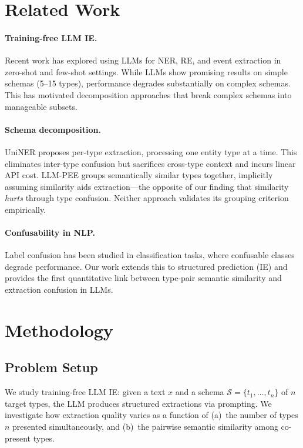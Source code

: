 \documentclass[11pt,a4paper]{article}
\begin{document}
\section{Related Work}
\label{sec:related}

\paragraph{Training-free LLM IE.}
Recent work has explored using LLMs for NER, RE, and event extraction in zero-shot and few-shot settings.
While LLMs show promising results on simple schemas (5--15 types), performance degrades substantially on complex schemas.
This has motivated decomposition approaches that break complex schemas into manageable subsets.

\paragraph{Schema decomposition.}
UniNER proposes per-type extraction, processing one entity type at a time.
This eliminates inter-type confusion but sacrifices cross-type context and incurs linear API cost.
LLM-PEE groups semantically similar types together, implicitly assuming similarity aids extraction---the opposite of our finding that similarity \emph{hurts} through type confusion.
Neither approach validates its grouping criterion empirically.

\paragraph{Confusability in NLP.}
Label confusion has been studied in classification tasks, where confusable classes degrade performance.
Our work extends this to structured prediction (IE) and provides the first quantitative link between type-pair semantic similarity and extraction confusion in LLMs.


\section{Methodology}
\label{sec:method}

\subsection{Problem Setup}

We study training-free LLM IE: given a text $x$ and a schema $\mathcal{S} = \{t_1, \ldots, t_n\}$ of $n$ target types, the LLM produces structured extractions via prompting.
We investigate how extraction quality varies as a function of (a)~the number of types $n$ presented simultaneously, and (b)~the pairwise semantic similarity among co-present types.
\end{document}
